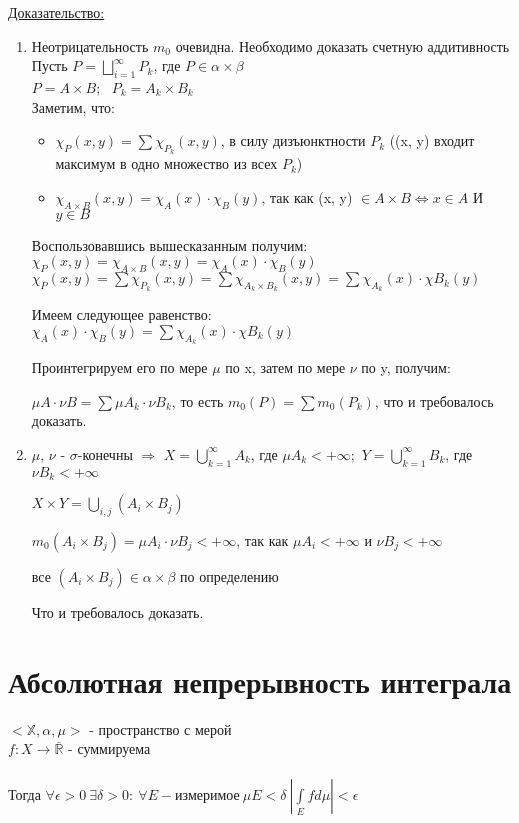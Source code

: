 \documentclass[paper=a4, fontsize=13.2pt]{article}
\begin{document}
\underline{Доказательство:} \\
\begin{enumerate}
	\item Неотрицательность $m_0$ очевидна. Необходимо доказать счетную аддитивность\\
	Пусть $P = \bigsqcup\limits_{i=1}^{\infty}P_{k}$, где $P \in \alpha \times \beta$ \\
	$P = A \times B$; \ $P_k = A_k \times B_k$ \\
	Заметим, что:
	\begin{itemize}
		\item $\chi_P(x, y) = \sum\chi_{P_k}(x, y)$, в силу дизъюнктности $P_k$ ((x, y) входит максимум в одно множество из всех $P_k$)
		\item $\chi_{A \times B}(x, y) = \chi_A(x) \cdot \chi_B(y)$, так как (x, y) $\in A\times B \Leftrightarrow x \in A$ И $y \in B$
	\end{itemize}
Воспользовавшись вышесказанным получим:\\
$\chi_{P}(x, y) = \chi_{A\times B}(x, y) = \chi_A(x) \cdot \chi_B(y)$\\
$\chi_{P}(x, y) = \sum\chi_{P_k}(x, y) = \sum\chi_{A_k \times B_k}(x, y) = \sum\chi_{A_k}(x) \cdot \chi{B_k}(y)$

Имеем следующее равенство:\\
$\chi_A(x) \cdot \chi_B(y) = \sum\chi_{A_k}(x) \cdot \chi{B_k}(y)$

Проинтегрируем его по мере $\mu$ по x, затем по мере $\nu$ по y, получим:

$\mu A \cdot \nu B = \sum \mu A_k \cdot \nu B_k$, то есть $m_0(P) = \sum m_0(P_k)$, что и требовалось доказать.
\item $\mu$, $\nu$ - $\sigma$-конечны $\Rightarrow$
$X = \bigcup\limits_{k=1}^{\infty} A_k$, где $\mu A_k < +\infty$;\
$Y = \bigcup\limits_{k=1}^{\infty} B_k$, где $\nu B_k < +\infty$

$X \times Y = \bigcup\limits_{i, j} (A_i \times B_j)$

$m_0(A_i \times B_j) = \mu A_i \cdot \nu B_j < +\infty$, так как $\mu A_i < +\infty$ и $\nu B_j < +\infty$

все $(A_i \times B_j) \in \alpha \times \beta$ по определению

Что и требовалось доказать.
\end{enumerate}

\section{Абсолютная непрерывность интеграла}
$<\mathds{X}, \alpha, \mu>$ - пространство с мерой\\
$f : X \to \overline{\mathds{R}}$ - суммируема\\\\
Тогда $\forall \epsilon > 0 ~ \exists \delta > 0 : ~ \forall E - \text{измеримое} ~ \mu E < \delta ~ |\int\limits_{E}f d\mu| < \epsilon$
\end{document}
